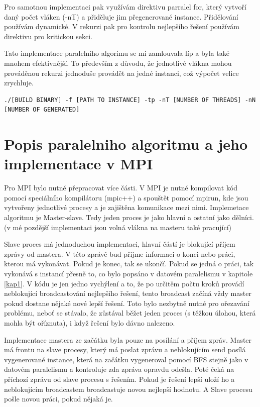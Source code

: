 \documentclass[]{article}
\begin{document}
Pro samotnou implementaci pak využívám direktivu parralel for, který vytvoří daný počet vláken (-nT) a přiděluje jim přegenerované instance. Přidělování používám dynamické. V rekurzi pak pro kontrolu nejlepšího řešení používám direktivu pro kritickou sekci.

Tato implementace paralelního algorimu se mi zamlouvala líp a byla také mnohem efektivnější. To především z důvodu, že jednotlivé vlákna mohou prováděnou rekurzi jednoduše provádět na jedné instanci, což výpočet velice zrychluje. 

\begin{verbatim}
./[BUILD BINARY] -f [PATH TO INSTANCE] -tp -nT [NUMBER OF THREADS] -nN [NUMBER OF GENERATED]
\end{verbatim}


\section{Popis paralelniho algoritmu a jeho implementace v MPI}

Pro MPI bylo nutné přepracovat více části. V MPI je nutné kompilovat kód pomocí speciálního kompilátoru (mpic++) a spouštět pomocí mpirun, kde jsou vytvořeny jednotlivé procesy a je zajištěna komunikace mezi nimi. Implemetace algoritmu je Master-slave. Tedy jeden proces je jako hlavní a ostatní jako dělníci. (v mé pozdější implementaci jsou volná vlákna na masteru také pracující)

Slave proces má jednoduchou implementaci, hlavní částí je blokující příjem zprávy od mastera. V této zprávě bud přijme informaci o konci nebo práci, kterou má vykonávat. Pokud je konec, tak se ukončí. Pokud se jedná o práci, tak vykonává s instancí přesně to, co bylo popsáno v datovém paralelismu v kapitole \ref{kap1}. V kódu je jen jedno vychýlení a to, že po určitěm počtu kroků provádí neblokující broadcastování nejlepšího řešení, tento broadcast začíná vždy master pokud dostane nějaké nové lepší řešení. Toto bylo nezbytně nutné pro ořezavání problému, neboť se stávalo, že zůstával běžet jeden proces (s těžkou úlohou, která mohla být oříznuta), i když řešení bylo dávno nalezeno.

Implementace mastera ze začátku byla pouze na posílání a příjem zpráv. Master má frontu na slave procesy, který má poslat zprávu a neblokujícím send posílá vygenerované instance, která na začátku vygeneroval pomocí BFS stejně jako v datovém paralelismu a kontroluje zda zpráva opravdu odešla. Poté čeká na příchozí zprávu od slave procesu s řešením. Pokud je řešení lepší uloží ho a neblokujícím broadcastem broadcastuje novou nejlepší hodnotu. A Slave procesu pošle novou práci, pokud nějaká je. 
\end{document}
